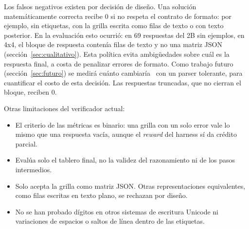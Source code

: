 Los falsos negativos existen por decisión de diseño. Una solución
matemáticamente correcta recibe 0 si no respeta el contrato de formato: por
ejemplo, sin etiquetas, con la grilla escrita como filas de texto o con texto
posterior. En la evaluación esto ocurrió: en 69 respuestas del 2B sin ejemplos,
en 4x4, el bloque de respuesta contenía filas de texto y no una matriz JSON
(sección~\ref{sec:cualitativo}). Esta política evita ambigüedades sobre cuál es
la respuesta final, a costa de penalizar errores de formato. Como trabajo futuro
(sección~\ref{sec:futuro}) se medirá cuánto cambiaría \passuno\ con un parser
tolerante, para cuantificar el costo de esta decisión. Las respuestas
truncadas, que no cierran el bloque, reciben 0.

Otras limitaciones del verificador actual:
\begin{itemize}
  \item El criterio de las métricas es binario: una grilla con un solo error
  vale lo mismo que una respuesta vacía, aunque el \emph{reward} del harness sí
  da crédito parcial.
  \item Evalúa solo el tablero final, no la validez del razonamiento ni de
  los pasos intermedios.
  \item Solo acepta la grilla como matriz JSON. Otras representaciones
  equivalentes, como filas escritas en texto plano, se rechazan por diseño.
  \item No se han probado dígitos en otros sistemas de escritura Unicode ni
  variaciones de espacios o saltos de línea dentro de las etiquetas.
\end{itemize}
